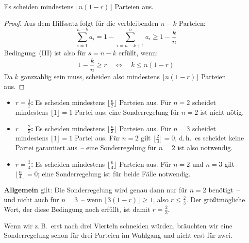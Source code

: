 \begin{hauptsatz}
Es scheiden mindestens $\lfloor n(1-r) \rfloor$ Parteien aus.
\end{hauptsatz}

\begin{proof}
Aus dem Hilfssatz folgt für die verbleibenden $n-k$ Parteien:
\begin{equation}
  \sum_{i=1}^{n-k} a_i = 1 - \sum_{i=n-k+1}^{n} a_i \geq 1 - \frac{k}{n}
\end{equation}
Bedingung~(III) ist also für $s = n-k$ erfüllt, wenn:
\begin{equation}
  1 - \frac{k}{n} \geq r \quad \Longleftrightarrow \quad k \leq n(1-r)
\end{equation}
Da $k$ ganzzahlig sein muss, scheiden also mindestens $\lfloor n(1-r) \rfloor$ Parteien aus.
\end{proof}


\begin{itemize}
  \item \textbf{$r = \frac{1}{2}$:} Es scheiden mindestens $\lfloor \frac{n}{2} \rfloor$
    Parteien aus. Für $n = 2$ scheidet mindestens $\lfloor 1 \rfloor = 1$ Partei aus; eine
    Sonderregelung für $n = 2$ ist nicht nötig.

  \item \textbf{$r = \frac{2}{3}$:} Es scheiden mindestens $\lfloor \frac{n}{3} \rfloor$
    Parteien aus. Für $n = 3$ scheidet mindestens $\lfloor 1 \rfloor = 1$ Partei aus.
    Für $n = 2$ gilt $\lfloor \frac{2}{3} \rfloor = 0$, d.\,h.\ es scheidet keine Partei
    garantiert aus~-- eine Sonderregelung für $n = 2$ ist also notwendig.

  \item \textbf{$r = \frac{3}{4}$:} Es scheiden mindestens $\lfloor \frac{n}{4} \rfloor$
    Parteien aus. Für $n = 2$ und $n = 3$ gilt $\lfloor \frac{n}{4} \rfloor = 0$; eine
    Sonderregelung ist für beide Fälle notwendig.
\end{itemize}

\textbf{Allgemein} gilt: Die Sonderregelung wird genau dann nur für $n = 2$ benötigt~-- und
nicht auch für $n = 3$~-- wenn $\lfloor 3(1-r) \rfloor \geq 1$, also $r \leq \frac{2}{3}$.
Der größtmögliche Wert, der diese Bedingung noch erfüllt, ist damit $r = \frac{2}{3}$.

Wenn wir z.\,B.\ erst nach drei Vierteln schneiden würden, bräuchten wir eine Sonderregelung
schon für drei Parteien im Wahlgang und nicht erst für zwei.

